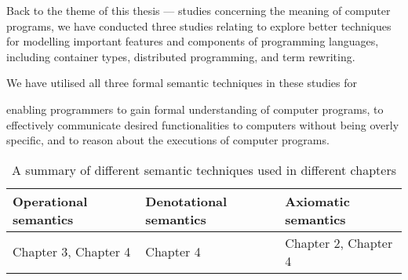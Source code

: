 Back to the theme of this thesis --- studies concerning the meaning of computer programs, we have conducted three studies relating to explore better techniques for modelling important features and components of programming languages, including container types, distributed programming, and term rewriting. \begin{highlightnew}We have utilised all three formal semantic techniques in these studies for\end{highlightnew} enabling programmers to gain formal understanding of computer programs, to effectively communicate desired functionalities to computers without being overly specific, and to reason about the executions of computer programs. 
\begin{table}[!t]
\centering
\caption {A summary of different semantic techniques used in different chapters} \label{chap5:summary} 
\begin{tabular}{ |l|l|l| } 
\hline
\textbf{Operational semantics} & \textbf{Denotational semantics} & \textbf{Axiomatic semantics}  \\\hline
Chapter 3, Chapter 4 & Chapter 4 & Chapter 2, Chapter 4\\
\hline
\end{tabular}
\end{table}

